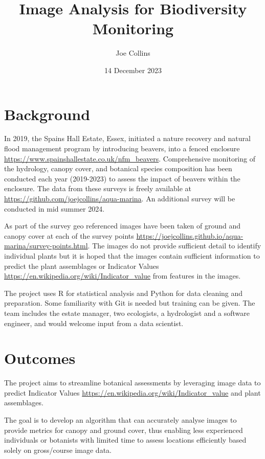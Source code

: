 \documentclass{roles}
\title{Image Analysis for Biodiversity Monitoring}
\author{Joe Collins}
\date{14 December 2023}
\begin{document}
\maketitle

\section*{Background}

In 2019, the Spains Hall Estate, Essex,
initiated a nature recovery and natural flood management program by introducing beavers,
into a fenced enclosure
\href{https://www.spainshallestate.co.uk/nfm\_beavers}{https://www.spainshallestate.co.uk/nfm\_beavers}.
Comprehensive monitoring of
the hydrology, canopy cover, and botanical species composition
has been conducted each year (2019-2023)
to assess the impact of beavers within the enclosure.
The data from these surveys is freely available at
\href{https://github.com/joejcollins/aqua-marina}{https://github.com/joejcollins/aqua-marina}.
An additional survey will be conducted in mid summer 2024.

As part of the survey geo referenced images have been taken
of ground and canopy cover at each of the survey points
\href{https://joejcollins.github.io/aqua-marina/survey-points.html}{https://joejcollins.github.io/aqua-marina/survey-points.html}.
The images do not provide sufficient detail to identify individual plants
but it is hoped that the images contain sufficient information to predict
the plant assemblages or Indicator Values
\href{https://en.wikipedia.org/wiki/Indicator\_value}{https://en.wikipedia.org/wiki/Indicator\_value}
from features in the images.

The project uses R for statistical analysis and Python for data cleaning and preparation.
Some familiarity with Git is needed but training can be given.
The team includes the estate manager, two ecologists, a hydrologist and a software engineer,
and would welcome input from a data scientist.

\section*{Outcomes}

The project aims to streamline botanical assessments by leveraging image data to predict Indicator Values
\href{https://en.wikipedia.org/wiki/Indicator\_value}{https://en.wikipedia.org/wiki/Indicator\_value} and plant assemblages.

The goal is to develop an algorithm that can accurately analyse images
to provide metrics for canopy and ground cover,
thus enabling less experienced individuals or
botanists with limited time to assess locations efficiently
based solely on gross/course image data.
\end{document}
